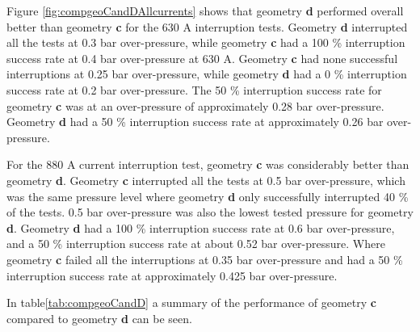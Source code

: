 \documentclass[10pt,b5paper,twoside]{article}
\begin{document}

Figure \ref{fig:compgeoCandDAllcurrents} shows that geometry \textbf{d} performed overall better than geometry \textbf{c} for the 630 A interruption tests. Geometry \textbf{d} interrupted all the tests at 0.3 bar over-pressure, while geometry \textbf{c} had a 100 \% interruption success rate at 0.4 bar over-pressure at 630 A. Geometry \textbf{c} had none successful interruptions at 0.25 bar over-pressure, while geometry \textbf{d} had a 0 \% interruption success rate at 0.2 bar over-pressure. The 50 \% interruption success rate for geometry \textbf{c} was at an over-pressure of approximately 0.28 bar over-pressure. Geometry \textbf{d} had a 50 \% interruption success rate at approximately 0.26 bar over-pressure.

For the 880 A current interruption test, geometry \textbf{c} was considerably better than geometry \textbf{d}. Geometry \textbf{c} interrupted all the tests at 0.5 bar over-pressure, which was the same pressure level where geometry \textbf{d} only successfully interrupted 40 \% of the tests. 0.5 bar over-pressure was also the lowest tested pressure for geometry \textbf{d}. Geometry \textbf{d} had a 100 \% interruption success rate at 0.6 bar over-pressure, and a 50 \% interruption success rate at about 0.52 bar over-pressure. Where geometry \textbf{c} failed all the interruptions at 0.35 bar over-pressure and had a 50 \% interruption success rate at approximately 0.425 bar over-pressure.

In table\ref{tab:compgeoCandD} a summary of the performance of geometry \textbf{c} compared to geometry \textbf{d} can be seen.
\end{document}
